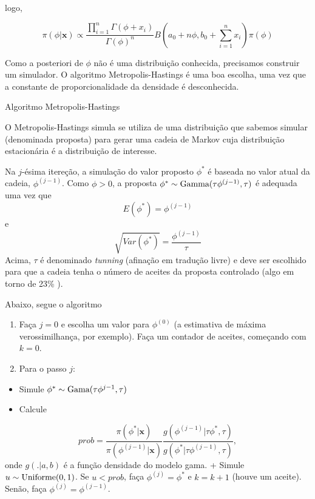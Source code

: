 \documentclass[
  letterpaper,
  DIV=11,
  numbers=noendperiod]{scrreprt}
\providecommand{\tightlist}{%
  \setlength{\itemsep}{0pt}\setlength{\parskip}{0pt}}\usepackage{longtable,booktabs,array}
\theoremstyle{definition}
\theoremstyle{plain}
\theoremstyle{definition}
\theoremstyle{remark}
\begin{document}
logo,

\[\pi(\phi|\boldsymbol{x})\propto \frac{\prod_{i=1}^n\Gamma(\phi+x_i)}{\Gamma(\phi)^n}B\left(a_0+n\phi,b_0+\sum_{i=1}^nx_i\right)\pi(\phi)\]

Como a posteriori de \(\phi\) não é uma distribuição conhecida,
precisamos construir um simulador. O algoritmo Metropolis-Hastings é uma
boa escolha, uma vez que a constante de proporcionalidade da densidade é
desconhecida.

Algoritmo Metropolis-Hastings

O Metropolis-Hastings simula se utiliza de uma distribuição que sabemos
simular (denominada proposta) para gerar uma cadeia de Markov cuja
distribuição estacionária é a distribuição de interesse.

Na \(j\)-ésima itereção, a simulação do valor proposto \(\phi^*\) é
baseada no valor atual da cadeia, \(\phi^{(j-1)}\). Como \(\phi>0\), a
proposta \(\phi^*\sim \hbox{Gamma}(\tau\phi^{(j-1)},\tau)\) é adequada
uma vez que \[E(\phi^*)=\phi^{(j-1)}\] e
\[\sqrt{Var(\phi^*)}=\frac{\phi^{(j-1)}}{\tau}\] Acima, \(\tau\) é
denominado \emph{tunning} (afinação em tradução livre) e deve ser
escolhido para que a cadeia tenha o número de aceites da proposta
controlado (algo em torno de 23\% ).

Abaixo, segue o algoritmo

\begin{enumerate}
\def\labelenumi{\arabic{enumi}.}
\item
  Faça \(j=0\) e escolha um valor para \(\phi^{(0)}\) (a estimativa de
  máxima verossimilhança, por exemplo). Faça um contador de aceites,
  começando com \(k=0\).
\item
  Para o passo \(j\):
\end{enumerate}

\begin{itemize}
\tightlist
\item
  Simule \(\phi^*\sim\hbox{Gama}(\tau\phi^{j-1},\tau)\)
\item
  Calcule
\end{itemize}

\[prob = \frac{\pi(\phi^*|\boldsymbol{x})}{\pi(\phi^{(j-1)}|\boldsymbol{x})}\frac{g(\phi^{(j-1)}|\tau\phi^*,\tau)}{g(\phi^*|\tau\phi^{(j-1)},\tau)},\]
onde \(g(.|a,b)\) é a função densidade do modelo gama. + Simule
\(u\sim\hbox{Uniforme}(0,1)\). Se \(u<prob\), faça \(\phi^{(j)}=\phi^*\)
e \(k=k+1\) (houve um aceite). Senão, faça \(\phi^{(j)}=\phi^{(j-1)}\).

\end{document}
